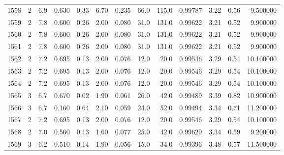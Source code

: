 \begin{tabular}{lrrrrrrrrrrrr}
1558 &        2 &            6.9 &             0.630 &         0.33 &            6.70 &      0.235 &                 66.0 &                 115.0 &  0.99787 &  3.22 &       0.56 &   9.500000 \\
1559 &        2 &            7.8 &             0.600 &         0.26 &            2.00 &      0.080 &                 31.0 &                 131.0 &  0.99622 &  3.21 &       0.52 &   9.900000 \\
1560 &        2 &            7.8 &             0.600 &         0.26 &            2.00 &      0.080 &                 31.0 &                 131.0 &  0.99622 &  3.21 &       0.52 &   9.900000 \\
1561 &        2 &            7.8 &             0.600 &         0.26 &            2.00 &      0.080 &                 31.0 &                 131.0 &  0.99622 &  3.21 &       0.52 &   9.900000 \\
1562 &        2 &            7.2 &             0.695 &         0.13 &            2.00 &      0.076 &                 12.0 &                  20.0 &  0.99546 &  3.29 &       0.54 &  10.100000 \\
1563 &        2 &            7.2 &             0.695 &         0.13 &            2.00 &      0.076 &                 12.0 &                  20.0 &  0.99546 &  3.29 &       0.54 &  10.100000 \\
1564 &        2 &            7.2 &             0.695 &         0.13 &            2.00 &      0.076 &                 12.0 &                  20.0 &  0.99546 &  3.29 &       0.54 &  10.100000 \\
1565 &        3 &            6.7 &             0.670 &         0.02 &            1.90 &      0.061 &                 26.0 &                  42.0 &  0.99489 &  3.39 &       0.82 &  10.900000 \\
1566 &        3 &            6.7 &             0.160 &         0.64 &            2.10 &      0.059 &                 24.0 &                  52.0 &  0.99494 &  3.34 &       0.71 &  11.200000 \\
1567 &        2 &            7.2 &             0.695 &         0.13 &            2.00 &      0.076 &                 12.0 &                  20.0 &  0.99546 &  3.29 &       0.54 &  10.100000 \\
1568 &        2 &            7.0 &             0.560 &         0.13 &            1.60 &      0.077 &                 25.0 &                  42.0 &  0.99629 &  3.34 &       0.59 &   9.200000 \\
1569 &        3 &            6.2 &             0.510 &         0.14 &            1.90 &      0.056 &                 15.0 &                  34.0 &  0.99396 &  3.48 &       0.57 &  11.500000 \\

\end{tabular}
